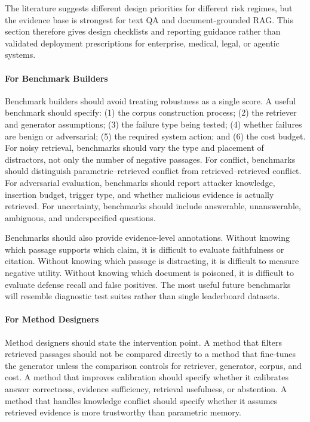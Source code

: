 
The literature suggests different design priorities for different risk regimes, but the evidence base is strongest for text QA and document-grounded RAG. This section therefore gives design checklists and reporting guidance rather than validated deployment prescriptions for enterprise, medical, legal, or agentic systems.

\paragraph{For Benchmark Builders}

Benchmark builders should avoid treating robustness as a single score. A useful benchmark should specify: (1) the corpus construction process; (2) the retriever and generator assumptions; (3) the failure type being tested; (4) whether failures are benign or adversarial; (5) the required system action; and (6) the cost budget. For noisy retrieval, benchmarks should vary the type and placement of distractors, not only the number of negative passages. For conflict, benchmarks should distinguish parametric--retrieved conflict from retrieved--retrieved conflict. For adversarial evaluation, benchmarks should report attacker knowledge, insertion budget, trigger type, and whether malicious evidence is actually retrieved. For uncertainty, benchmarks should include answerable, unanswerable, ambiguous, and underspecified questions.

Benchmarks should also provide evidence-level annotations. Without knowing which passage supports which claim, it is difficult to evaluate faithfulness or citation. Without knowing which passage is distracting, it is difficult to measure negative utility. Without knowing which document is poisoned, it is difficult to evaluate defense recall and false positives. The most useful future benchmarks will resemble diagnostic test suites rather than single leaderboard datasets.

\paragraph{For Method Designers}

Method designers should state the intervention point. A method that filters retrieved passages should not be compared directly to a method that fine-tunes the generator unless the comparison controls for retriever, generator, corpus, and cost. A method that improves calibration should specify whether it calibrates answer correctness, evidence sufficiency, retrieval usefulness, or abstention. A method that handles knowledge conflict should specify whether it assumes retrieved evidence is more trustworthy than parametric memory.


